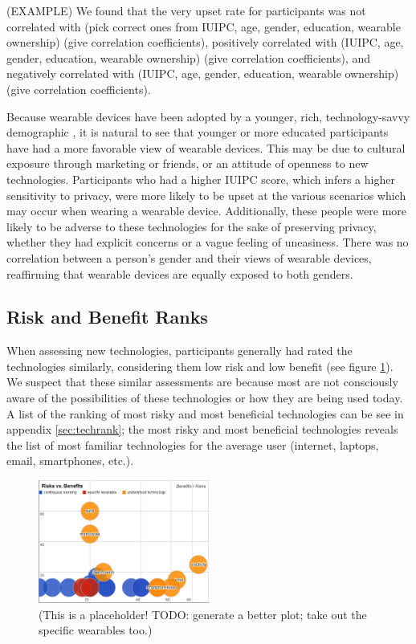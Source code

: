 \documentclass{acm_proc_article-sp}
\begin{document}
(EXAMPLE) We found that the very upset rate for participants was not correlated with (pick correct ones from IUIPC, age, gender, education, wearable ownership) (give correlation coefficients), positively correlated with  (IUIPC, age, gender, education, wearable ownership) (give correlation coefficients), and negatively correlated with  (IUIPC, age, gender, education, wearable ownership) (give correlation coefficients). 

Because wearable devices have been adopted by a younger, rich, technology-savvy demographic  \cite{cmo}, it is natural to see that younger or more educated participants have had a more favorable view of wearable devices. This may be due to cultural exposure through marketing or friends, or an attitude of openness to new technologies. Participants who had a higher IUIPC score, which infers a higher sensitivity to privacy, were more likely to be upset at the various scenarios which may occur when wearing a wearable device. Additionally, these people were more likely to be adverse to these technologies for the sake of preserving privacy, whether they had explicit concerns or a vague feeling of uneasiness. There was no correlation between a person's gender and their views of wearable devices, reaffirming that wearable devices are equally exposed to both genders. 


\subsection{Risk and Benefit Ranks} 
When assessing new technologies, participants generally had rated the technologies similarly, considering them low risk and low benefit (see figure \ref{fig:techplot}). We suspect that these similar assessments are because most are not consciously aware of the possibilities of these technologies or how they are being used today. A list of the ranking of most risky and most beneficial technologies can be see in appendix \ref{sec:techrank}; the most risky and most beneficial technologies reveals the list of most familiar technologies for the average user (internet, laptops, email, smartphones, etc.). 


\begin{figure}
	\centering
	\includegraphics[width=0.5\textwidth]{techplot.png}
	\caption{(This is a placeholder! TODO: generate a better plot; take out the specific wearables too.)}
	\label{fig:techplot}
\end{figure}
\end{document}
